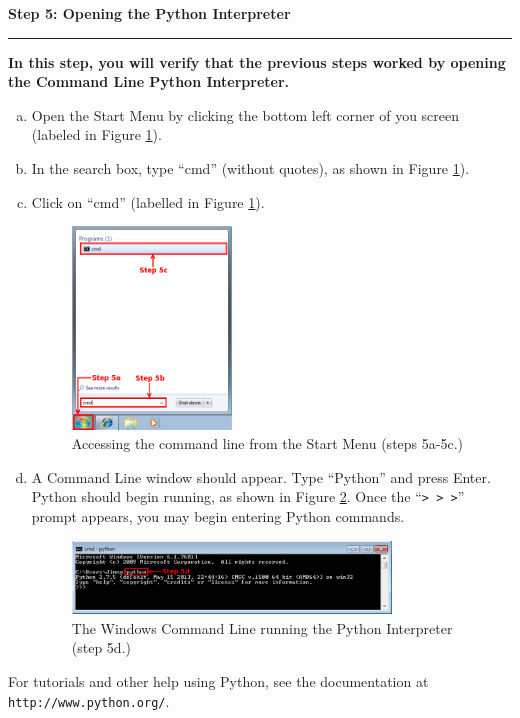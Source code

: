 \documentclass[11pt,english]{article}
\newcommand{\myhrule}{\vspace{0.3cm}\hrule\vspace{0.3cm}}
\begin{document}
\newpage
{\Large {\bf Step 5: Opening the Python Interpreter}}
\myhrule
{\bf In this step, you will verify that the previous steps worked by opening
the Command Line Python Interpreter.}\\

\begin{enumerate}[a.]
\item Open the Start Menu by clicking the bottom left corner of you screen
(labeled in Figure \ref{fig:dia9}).
\item In the search box, type ``cmd'' (without quotes), as shown in Figure
\ref{fig:dia9}).
\item Click on ``cmd'' (labelled in Figure \ref{fig:dia9}).
\begin{figure}[h]
\begin{center}
\includegraphics[width=0.4\textwidth]{dia9}
\end{center}
\vspace{-0.5cm}
\caption{Accessing the command line from the Start Menu (steps 5a-5c.)}
\label{fig:dia9}
\end{figure}
\item A Command Line window should appear. Type ``Python'' and press Enter.
Python should begin running, as shown in Figure \ref{fig:dia10}. Once the
``\texttt{> > >}'' prompt appears, you may begin entering Python commands.
\begin{figure}[h]
\begin{center}
\includegraphics[width=0.8\textwidth]{dia10}
\end{center}
\vspace{-0.5cm}
\caption{The Windows Command Line running the Python Interpreter (step 5d.)}
\label{fig:dia10}
\end{figure}
\end{enumerate}

For tutorials and other help using Python, see the documentation at
\texttt{http://www.python.org/}.
\end{document}
